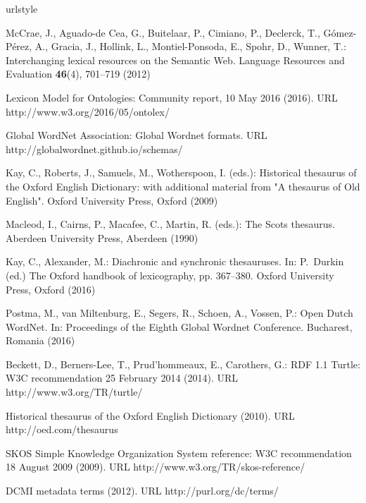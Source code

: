 \begin{thebibliography}{10}
	\providecommand{\url}[1]{{#1}}
	\providecommand{\urlprefix}{URL }
	\expandafter\ifx\csname urlstyle\endcsname\relax
	\providecommand{\doi}[1]{DOI~\discretionary{}{}{}#1}\else
	\providecommand{\doi}{DOI~\discretionary{}{}{}\begingroup
		\urlstyle{rm}\Url}\fi
	
	McCrae, J., Aguado-de Cea, G., Buitelaar, P., Cimiano, P., Declerck, T.,
	Gómez-Pérez, A., Gracia, J., Hollink, L., Montiel-Ponsoda, E., Spohr, D.,
	Wunner, T.: Interchanging lexical resources on the {Semantic} {Web}.
	\newblock Language Resources and Evaluation \textbf{46}(4), 701--719 (2012)
	
	Lexicon {Model} for {Ontologies}: Community report, 10 {May} 2016 (2016).
	\newblock \urlprefix\url{http://www.w3.org/2016/05/ontolex/}
	
	{Global WordNet Association}: Global {Wordnet} formats.
	\newblock \urlprefix\url{http://globalwordnet.github.io/schemas/}
	
	Kay, C., Roberts, J., Samuels, M., Wotherspoon, I. (eds.): Historical thesaurus
	of the {Oxford} {English} {Dictionary}: with additional material from "{A}
	thesaurus of {Old} {English}".
	\newblock Oxford University Press, Oxford (2009)
	
	Macleod, I., Cairns, P., Macafee, C., Martin, R. (eds.): The {Scots} thesaurus.
	\newblock Aberdeen University Press, Aberdeen (1990)
	
	Kay, C., Alexander, M.: Diachronic and synchronic thesauruses.
	\newblock In: P.~Durkin (ed.) The {Oxford} handbook of lexicography, pp.
	367--380. Oxford University Press, Oxford (2016)
	
	Postma, M., van Miltenburg, E., Segers, R., Schoen, A., Vossen, P.: Open
	{Dutch} {WordNet}.
	\newblock In: Proceedings of the {Eighth} {Global} {Wordnet} {Conference}.
	Bucharest, Romania (2016)
	
	Beckett, D., Berners-Lee, T., Prud'hommeaux, E., Carothers, G.: {RDF} 1.1
	{Turtle}: {W3C} recommendation 25 {February} 2014 (2014).
	\newblock \urlprefix\url{http://www.w3.org/TR/turtle/}
	
	Historical thesaurus of the {Oxford} {English} {Dictionary} (2010).
	\newblock \urlprefix\url{http://oed.com/thesaurus}
	
	{SKOS} {Simple} {Knowledge} {Organization} {System} reference: {W3C}
	recommendation 18 {August} 2009 (2009).
	\newblock \urlprefix\url{http://www.w3.org/TR/skos-reference/}
	
	{DCMI} metadata terms (2012).
	\newblock \urlprefix\url{http://purl.org/dc/terms/}
\end{thebibliography}
